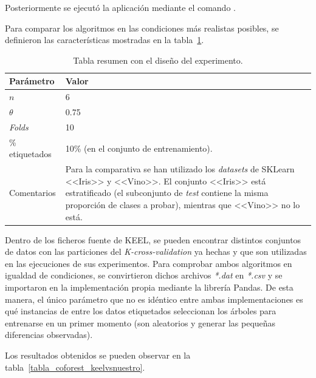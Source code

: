 Posteriormente se ejecutó la aplicación mediante el comando .

Para comparar los algoritmos en las condiciones más realistas posibles, se definieron las características mostradas en la tabla~\ref{tabla_coforest_keelvsnuestro_diseño}.

\begin{table}
	\begin{centering}
		\begin{tabular}{@{}p{10em} p{20em} @{}}
			\toprule
			\textbf{Parámetro} & \textbf{Valor} \\ 
			\midrule
			$n$ & 6\\
			$\theta$ & 0.75 \\
			\textit{Folds} & 10 \\
			\% etiquetados & 10\% (en el conjunto de entrenamiento). \\
			Comentarios & Para la comparativa se han utilizado los \textit{datasets} de SKLearn <<Iris>> y <<Vino>>. El conjunto <<Iris>> está estratificado (el subconjunto de \textit{test} contiene la misma proporción de clases a probar), mientras que <<Vino>> no lo está. \\
			\bottomrule
			
		\end{tabular}
	\end{centering}
	\caption{Tabla resumen con el diseño del experimento.}
	\label{tabla_coforest_keelvsnuestro_diseño}	
\end{table}

Dentro de los ficheros fuente de KEEL, se pueden encontrar distintos conjuntos de datos con las particiones del \textit{K-cross-validation} ya hechas y que son utilizadas en las ejecuciones de sus experimentos. Para comprobar ambos algoritmos en igualdad de condiciones, se convirtieron dichos archivos \textit{*.dat} en \textit{*.csv} y se importaron en la implementación propia mediante la librería Pandas. De esta manera, el único parámetro que no es idéntico entre ambas implementaciones es qué instancias de entre los datos etiquetados seleccionan los árboles para entrenarse en un primer momento (son aleatorios y generar las pequeñas diferencias observadas).

Los resultados obtenidos se pueden observar en la tabla~\ref{tabla_coforest_keelvsnuestro}.


